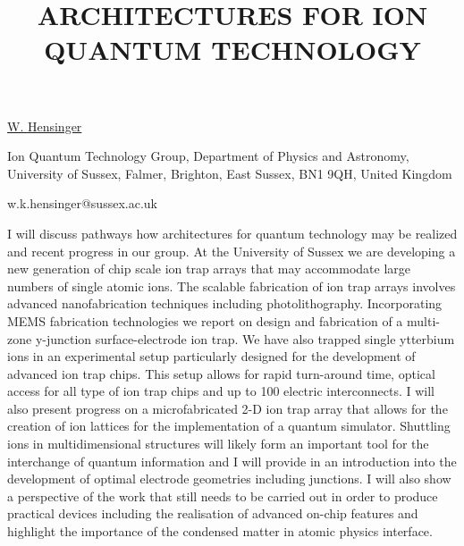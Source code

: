 \title{ARCHITECTURES FOR ION QUANTUM TECHNOLOGY}

\underline{W. Hensinger} 

{\normalsize{\vspace{-4mm}
Ion Quantum Technology Group, Department of Physics and Astronomy,
University of Sussex, Falmer, Brighton, East Sussex, BN1 9QH, United
Kingdom

\email w.k.hensinger@sussex.ac.uk}}

I will discuss pathways how architectures for quantum technology may be realized and recent progress
in our group. At the University of Sussex we are developing a new generation of chip scale ion trap
arrays that may accommodate large numbers of single atomic ions. The scalable fabrication of ion
trap arrays involves advanced nanofabrication techniques including photolithography. Incorporating
MEMS fabrication technologies we report on design and fabrication of a multi-zone y-junction
surface-electrode ion trap. We have also trapped single ytterbium ions in an experimental setup
particularly designed for the development of advanced ion trap chips. This setup allows for rapid
turn-around time, optical access for all type of ion trap chips and up to 100 electric
interconnects. I will also present progress on a microfabricated 2-D ion trap array that allows for
the creation of ion lattices for the implementation of a quantum simulator.  Shuttling ions in
multidimensional structures will likely form an important tool for the interchange of quantum
information and I will provide in an introduction into the development of optimal electrode
geometries including junctions.  I will also show a perspective of the work that still needs to be
carried out in order to produce practical devices including the realisation of advanced on-chip
features and highlight the importance of the condensed matter in atomic physics interface.

\vspace{\baselineskip} 